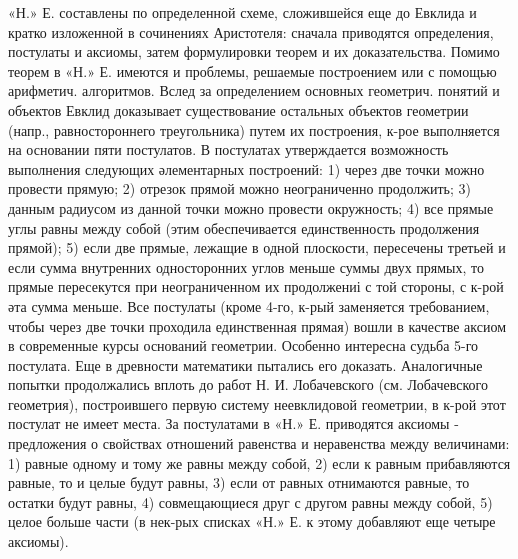 \documentclass[10pt]{article}
\begin{document}
«Н.» Е. составлены по определенной схеме, сложившейся еще до Евклида и кратко изложенной в сочинениях Аристотеля: сначала приводятся определения, постулаты и аксиомы, затем формулировки теорем и их доказательства. Помимо теорем в «Н.» Е. имеются и проблемы, решаемые построением или с помощью арифметич. алгоритмов. Вслед за определением основных геометрич. понятий и объектов Евклид доказывает существование остальных объектов геометрии (напр., равностороннего треугольника) путем их построения, к-рое выполняется на основании пяти постулатов. В постулатах утверждается возможность выполнения следующих әлементарных построений: 1) через две точки можно провести прямую; 2) отрезок прямой можно неограниченно продолжить; 3) данным радиусом из данной точки можно провести окружность; 4) все прямые углы равны между собой (этим обеспечивается единственность продолжения прямой); 5) если две прямые, лежащие в одной плоскости, пересечены третьей и если сумма внутренних односторонних углов меньше суммы двух прямых, то прямые пересекутся при неограниченном их продолжениі с той стороны, с к-рой әта сумма меньше. Все постулаты (кроме 4-го, к-рый заменяется требованием, чтобы через две точки проходила единственная прямая) вошли в качестве аксиом в современные курсы оснований геометрии. Особенно интересна судьба 5-го постулата. Еще в древности математики пытались его доказать. Аналогичные попытки продолжались вплоть до работ Н. И. Лобачевского (см. Лобачевского геометрия), построившего первую систему неевклидовой геометрии, в к-рой этот постулат не имеет места. За постулатами в «Н.» Е. приводятся аксиомы - предложения о свойствах отношений равенства и неравенства между величинами: 1) равные одному и тому же равны между собой, 2) если к равным прибавляются равные, то и целые будут равны, 3) если от равных отнимаются равные, то остатки будут равны, 4) совмещающиеся друг с другом равны между собой, 5) целое больше части (в нек-рых списках «Н.» Е. к этому добавляют еще четыре аксиомы).
\end{document}
